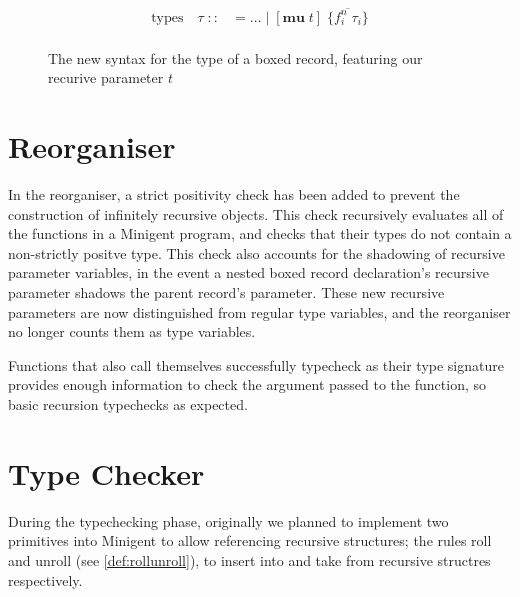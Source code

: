 \begin{figure}
    \centering
    \begin{align*}
        \text{types}\quad \tau\;
            ::&= \dots\; |\; [\textbf{mu}\; t]\; \{ \overline{f_i^n\; \tau_i} \} \\
    \end{align*}
    \caption{The new syntax for the type of a boxed record, featuring our recurive parameter $t$}
    \label{fig:recursivetypegrammar}
\end{figure}


\section{Reorganiser}

In the reorganiser, a strict positivity check has been added to prevent the construction of infinitely
recursive objects. This check recursively evaluates all of the functions in a Minigent program, and
checks that their types do not contain a non-strictly positve type. This check also accounts for the
shadowing of recursive parameter variables, in the event a nested boxed record declaration's recursive
parameter shadows the parent record's parameter. These new recursive parameters are now distinguished from
regular type variables, and the reorganiser no longer counts them as type variables.

Functions that also call themselves successfully typecheck as their type signature provides enough information
to check the argument passed to the function, so basic recursion typechecks as expected.


\section{Type Checker}
\label{sec:typecheckingprogress}

During the typechecking phase, originally we planned to implement two primitives into Minigent to allow referencing
recursive structures; the rules \textsf{roll} and \textsf{unroll} (see \autoref{def:rollunroll}), to insert into and take from recursive structres respectively.

